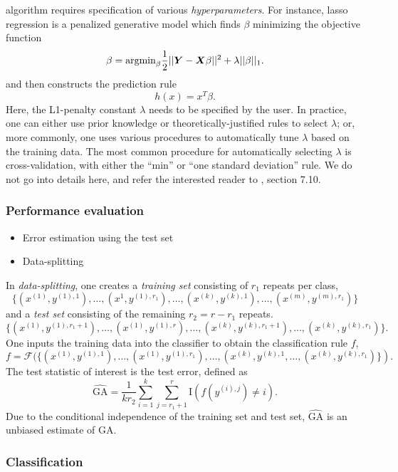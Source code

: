 algorithm requires specification of various \emph{hyperparameters}.
For instance, lasso regression is a penalized generative model which
finds $\beta$ minimizing the objective function
\[
\beta = \text{argmin}_\beta \frac{1}{2}||\boldsymbol{Y} - \boldsymbol{X} \beta||^2 + \lambda ||\beta||_1.
\]
and then constructs the prediction rule
\[
h(x) = x^T \beta.
\]
Here, the L1-penalty constant $\lambda$ needs to be specified by the
user.  In practice, one can either use prior knowledge or
theoretically-justified rules to select $\lambda$; or, more commonly,
one uses various procedures to automatically tune $\lambda$ based on
the training data.  The most common procedure for automatically
selecting $\lambda$ is cross-validation, with either the ``min'' or
``one standard deviation'' rule.  We do not go into details here, and
refer the interested reader to \cite{Hastie2009a}, section 7.10.

\subsubsection{Performance evaluation}

\begin{itemize}
\item Error estimation using the test set
\item Data-splitting
\end{itemize}

In \emph{data-splitting}, one creates a \emph{training
set} consisting of $r_1$ repeats per class,
\[
\{(x^{(1)}, y^{(1),1}),\hdots, (x^1,y^{(1), r_1}), \hdots, (x^{(k)}, y^{(k),1}),\hdots, (x^{(m)},y^{(m), r_1})\}
\]
and a \emph{test set} consisting of the remaining $r_2 = r - r_1$ repeats.
\[
\{(x^{(1)}, y^{(1), r_1 + 1}),\hdots, (x^{(1)},y^{(1),r}), \hdots, (x^{(k)}, y^{(k), r_1 + 1}),\hdots, (x^{(k)},y^{(k),r_1})\}.
\]
One inputs the training data into the classifier to obtain the classification rule $f$,
\[
f = \mathcal{F}(\{(x^{(1)}, y^{(1),1}),\hdots, (x^{(1)},y^{(1),r_1}), \hdots, (x^{(k)}, y^{(k),1},\hdots, (x^{(k)},y^{(k), r_1})\}).
\]
The test statistic of interest is the test error,
defined as
\[
\widehat{\text{GA}} = \frac{1}{k r_2} \sum_{i=1}^k \sum_{j = r_1 + 1}^r \text{I}(f(y^{(i),j}) \neq i).
\]
Due to the conditional independence of the training set and test set,
$\widehat{\text{GA}}$ is an unbiased estimate of $\text{GA}$.

\subsubsection{Classification}

